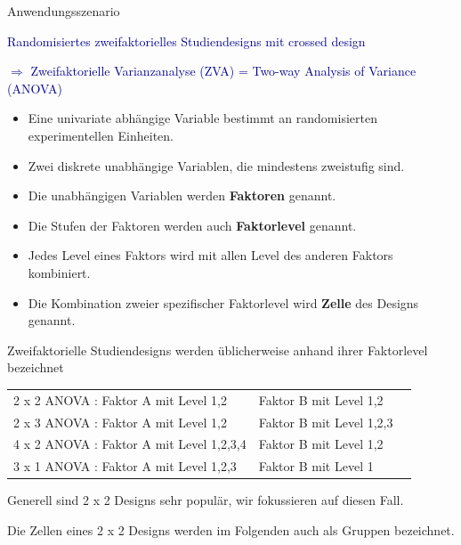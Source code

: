 \documentclass[
  8pt,
  ignorenonframetext,
]{beamer}
\providecommand{\tightlist}{%
  \setlength{\itemsep}{0pt}\setlength{\parskip}{0pt}}
\begin{document}
\begin{frame}{Anwendungsszenario}
\protect\hypertarget{anwendungsszenario}{}

\textcolor{darkblue}{Randomisiertes zweifaktorielles Studiendesigns mit crossed design}

\flushright

\textcolor{darkblue}{$\Rightarrow$ Zweifaktorielle Varianzanalyse (ZVA) = Two-way Analysis of Variance (ANOVA)}

\flushleft
\small

\begin{itemize}
\tightlist
\item
  Eine univariate abhängige Variable bestimmt an randomisierten
  experimentellen Einheiten.
\item
  Zwei diskrete unabhängige Variablen, die mindestens zweistufig sind.
\item
  Die unabhängigen Variablen werden \textbf{Faktoren} genannt.
\item
  Die Stufen der Faktoren werden auch \textbf{Faktorlevel} genannt.
\item
  Jedes Level eines Faktors wird mit allen Level des anderen Faktors
  kombiniert.
\item
  Die Kombination zweier spezifischer Faktorlevel wird \textbf{Zelle}
  des Designs genannt.
\end{itemize}

Zweifaktorielle Studiendesigns werden üblicherweise anhand ihrer
Faktorlevel bezeichnet

\small
\center
\begin{tabular}{lll}
2 x 2 ANOVA : Faktor A mit Level 1,2     & Faktor B mit Level 1,2       \\
2 x 3 ANOVA : Faktor A mit Level 1,2     & Faktor B mit Level 1,2,3     \\
4 x 2 ANOVA : Faktor A mit Level 1,2,3,4 & Faktor B mit Level 1,2       \\
3 x 1 ANOVA : Faktor A mit Level 1,2,3   & Faktor B mit Level 1
\end{tabular}

\flushleft

Generell sind 2 x 2 Designs sehr populär, wir fokussieren auf diesen
Fall.

Die Zellen eines 2 x 2 Designs werden im Folgenden auch als Gruppen
bezeichnet.
\end{frame}
\end{document}
